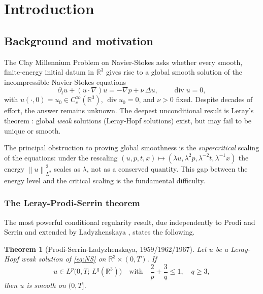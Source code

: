 \documentclass[12pt]{article}
\theoremstyle{plain}
\newtheorem{theorem}{Theorem}[section]
\theoremstyle{definition}
\theoremstyle{remark}
\newcommand{\R}{\mathbb{R}}
\newcommand{\norm}[1]{\left\|#1\right\|}
\newcommand{\pa}{\partial}
\newcommand{\grad}{\nabla}
\newcommand{\Div}{\operatorname{div}}
\newcommand{\lap}{\Delta}
\begin{document}
\section{Introduction}

\subsection{Background and motivation}

The Clay Millennium Problem on Navier-Stokes \cite{Fefferman2000} asks whether every
smooth, finite-energy initial datum in $\R^3$ gives rise to a global smooth solution
of the incompressible Navier-Stokes equations
\begin{equation}\label{eq:NS}
  \pa_t u + (u\cdot\grad)u = -\grad p + \nu\,\lap u,
  \qquad \Div u = 0,
\end{equation}
with $u(\cdot,0)=u_0\in C^\infty_c(\R^3)$, $\Div u_0=0$, and $\nu>0$ fixed.
Despite decades of effort, the answer remains unknown.
The deepest unconditional result is Leray's theorem \cite{Leray1934}: global
\emph{weak} solutions (Leray-Hopf solutions) exist, but may fail to be unique or smooth.

The principal obstruction to proving global smoothness is the \emph{supercritical}
scaling of the equations: under the rescaling $(u,p,t,x)\mapsto
(\lambda u,\lambda^2 p,\lambda^{-2}t,\lambda^{-1}x)$ the energy $\norm{u}_{L^2}^2$
scales as $\lambda$, not as a conserved quantity.
This gap between the energy level and the critical scaling is the fundamental
difficulty.

\subsubsection*{The Leray-Prodi-Serrin theorem}

The most powerful conditional regularity result, due independently to Prodi
\cite{Prodi1959} and Serrin \cite{Serrin1962} and extended by Ladyzhenskaya
\cite{Ladyzhenskaya1967}, states the following.

\begin{theorem}[Prodi-Serrin-Ladyzhenskaya, 1959/1962/1967]\label{thm:LPS}
  Let $u$ be a Leray-Hopf weak solution of \eqref{eq:NS} on $\R^3\times(0,T)$.
  If
  \begin{equation}\label{eq:serrin-condition}
    u\in L^p\bigl(0,T;\,L^q(\R^3)\bigr)
    \quad\text{with}\quad
    \frac{2}{p}+\frac{3}{q}\leq 1,\quad q\geq 3,
  \end{equation}
  then $u$ is smooth on $(0,T]$.
\end{theorem}
\end{document}

